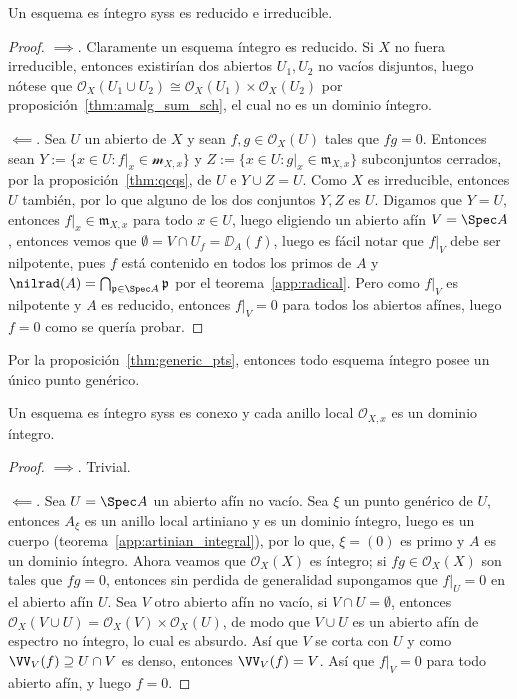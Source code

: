 \begin{prop}
	Un esquema es íntegro syss es reducido e irreducible.
\end{prop}
\begin{proof}
	$\implies.$ Claramente un esquema íntegro es reducido.
	Si $X$ no fuera irreducible, entonces existirían dos abiertos $U_1, U_2$ no vacíos disjuntos, luego nótese que $\mathscr{O}_X(U_1 \cup U_2)
	\cong \mathscr{O}_X(U_1) \times \mathscr{O}_X(U_2)$ por proposición~\ref{thm:amalg_sum_sch}, el cual no es un dominio íntegro.

	$\impliedby.$ Sea $U$ un abierto de $X$ y sean $f, g \in \mathscr{O}_X(U)$ tales que $fg = 0$.
	Entonces sean $Y := \{ x \in U : f|_x \in \mathscr{m}_{X, x} \}$ y $Z := \{ x \in U : g|_x \in \mathfrak{m}_{X, x} \}$ subconjuntos cerrados,
	por la proposición~\ref{thm:qcqs}, de $U$ e $Y \cup Z = U$.
	Como $X$ es irreducible, entonces $U$ también, por lo que alguno de los dos conjuntos $Y, Z$ es $U$.
	Digamos que $Y = U$, entonces $f|_x \in \mathfrak{m}_{X, x}$ para todo $x \in U$, luego eligiendo un abierto afín $V = \Spec A$,
	entonces vemos que $\emptyset = V \cap U_f = \DD_A(f)$, luego es fácil notar que $f|_V$ debe ser nilpotente, pues $f$ está contenido en todos los
	primos de $A$ y $\nilrad(A) = \bigcap_{\mathfrak{p} \in \Spec A} \mathfrak{p}$ por el teorema~\ref{app:radical}.
	Pero como $f|_V$ es nilpotente y $A$ es reducido, entonces $f|_V = 0$ para todos los abiertos afínes, luego $f = 0$ como se quería probar.
\end{proof}
Por la proposición~\ref{thm:generic_pts}, entonces todo esquema íntegro posee un único punto genérico.

\begin{cor}\label{thm:integral=loc_int+connected}
	Un esquema es íntegro syss es conexo y cada anillo local $\mathscr{O}_{X, x}$ es un dominio íntegro.
\end{cor}
\begin{proof}
	$\implies.$ Trivial.

	$\impliedby.$ Sea $U = \Spec A$ un abierto afín no vacío.
	Sea $\xi$ un punto genérico de $U$, entonces $A_\xi$ es un anillo local artiniano y es un dominio íntegro, luego es un cuerpo
	(teorema~\ref{app:artinian_integral}), por lo que, $\xi = (0)$ es primo y $A$ es un dominio íntegro.
	Ahora veamos que $\mathscr{O}_X(X)$ es íntegro; si $fg \in \mathscr{O}_X(X)$ son tales que $f g = 0$, entonces sin perdida de generalidad
	supongamos que $f|_U = 0$ en el abierto afín $U$.
	Sea $V$ otro abierto afín no vacío, si $V \cap U = \emptyset$, entonces $\mathscr{O}_X(V \cup U) = \mathscr{O}_X(V) \times \mathscr{O}_X(U)$,
	de modo que $V \cup U$ es un abierto afín de espectro no íntegro, lo cual es absurdo.
	Así que $V$ se corta con $U$ y como $\VV_V(f ) \supseteq U \cap V$ es denso, entonces $\VV_V(f ) = V$.
	Así que $f|_V = 0$ para todo abierto afín, y luego $f = 0$.
\end{proof}

